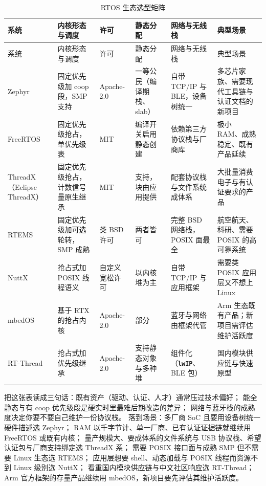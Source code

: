 \documentclass[12pt,a4paper,fontset=fandol]{ctexbook}
\newcommand{\Lib}[1]{\textbf{\texttt{#1}}}
\begin{document}
\begin{longtable}{>{\raggedright\arraybackslash}p{}
                  >{\raggedright\arraybackslash}p{}
                  >{\raggedright\arraybackslash}p{}
                  >{\raggedright\arraybackslash}p{}
                  >{\raggedright\arraybackslash}p{}
                  >{\raggedright\arraybackslash}p{}}
\caption{RTOS 生态选型矩阵}\label{tab:ch07-ecosystem}\\
\toprule
系统 & 内核形态与调度 & 许可 & 静态分配 & 网络与无线栈 & 典型场景 \\
\midrule
\endfirsthead
\toprule
系统 & 内核形态与调度 & 许可 & 静态分配 & 网络与无线栈 & 典型场景 \\
\midrule
\endhead
\bottomrule
\endfoot
\endlastfoot
Zephyr & 固定优先级加 coop 段，SMP 支持 & Apache-2.0 & 一等公民（编译期栈、slab） & 自带 TCP/IP 与 BLE，设备树统一 & 多芯片家族、需要现代工具链与认证文档的新项目 \\
FreeRTOS & 固定优先级抢占，单优先级表 & MIT & 编译开关启用静态创建 & 依赖第三方协议栈与厂商库 & 极小 RAM、成熟稳定、既有产品延续 \\
ThreadX（Eclipse ThreadX） & 固定优先级抢占，计数信号量原生继承 & MIT & 支持，块由应用提供 & 配套协议栈与文件系统成体系 & 大批量消费电子与有认证要求的产品 \\
RTEMS & 固定优先级加可选轮转，SMP 成熟 & 类 BSD 许可 & 两者皆可 & 完整 BSD 网络栈，POSIX 面最全 & 航空航天、科研、需要 POSIX 的高可靠系统 \\
NuttX & 抢占式加 POSIX 线程语义 & 自定义宽松许可 & 以内核堆为主 & 自带 TCP/IP 与应用框架 & 需要类 POSIX 应用层又不想上 Linux \\
mbedOS & 基于 RTX 的抢占内核 & Apache-2.0 & 部分 & 蓝牙与网络由框架代管 & Arm 生态既有产品；新项目需评估维护活跃度 \\
RT-Thread & 抢占式加优先级继承 & Apache-2.0 & 支持静态对象与多种堆 & 组件化（\Lib{lwIP}、BLE 包） & 国内模块供应链与快速原型 \\
\end{longtable}

把这张表读成三句话：既有资产（驱动、认证、人才）通常压过技术偏好；
能全静态与有 coop 优先级段是硬实时里最难后期改造的差异；
网络与蓝牙栈的成熟度决定你要不要自己维护一份协议栈。
落到场景：多厂商 SoC 且要用设备树统一硬件描述选 Zephyr；
RAM 以千字节计、单一厂商、已有认证证据链就继续用 FreeRTOS 或既有内核；
量产规模大、要成体系的文件系统与 USB 协议栈、希望认证包与厂商支持绑定选 ThreadX 系；
需要 POSIX 接口面与成熟 SMP 但不需要 Linux 生态选 RTEMS；
应用层想要 shell、动态加载与 POSIX 线程而资源不到 Linux 级别选 NuttX；
看重国内模块供应链与中文社区响应选 RT-Thread；
Arm 官方框架的存量产品继续用 mbedOS，新项目要先评估其维护活跃度。
\end{document}
